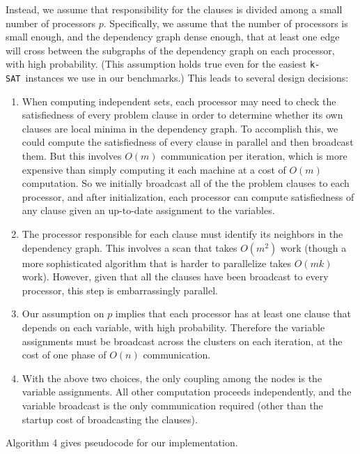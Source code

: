 \documentclass[twocolumn]{article}
\newcommand{\ksat}{\texttt{k-SAT}~}
\begin{document}
Instead, we assume that responsibility for the clauses is divided among a small number of processors $p$.  Specifically, we assume that the number of processors is small enough, and the dependency graph dense enough, that at least one edge will cross between the subgraphs of the dependency graph on each processor, with high probability.  (This assumption holds true even for the easiest \ksat instances we use in our benchmarks.)  This leads to several design decisions:
\begin{enumerate}
  \item When computing independent sets, each processor may need to check the satisfiedness of every problem clause in order to determine whether its own clauses are local minima in the dependency graph.  To accomplish this, we could compute the satisfiedness of every clause in parallel and then broadcast them.  But this involves $O(m)$ communication per iteration, which is more expensive than simply computing it each machine at a cost of $O(m)$ computation.  So we initially broadcast all of the the problem clauses to each processor, and after initialization, each processor can compute satisfiedness of any clause given an up-to-date assignment to the variables.
  \item The processor responsible for each clause must identify its neighbors in the dependency graph.  This involves a scan that takes $O(m^2)$ work (though a more sophisticated algorithm that is harder to parallelize takes $O(m k)$ work).  However, given that all the clauses have been broadcast to every processor, this step is embarrassingly parallel.
  \item Our assumption on $p$ implies that each processor has at least one clause that depends on each variable, with high probability.  Therefore the variable assignments must be broadcast across the clusters on each iteration, at the cost of one phase of $O(n)$ communication.
  \item With the above two choices, the only coupling among the nodes is the variable assignments.  All other computation proceeds independently, and the variable broadcast is the only communication required (other than the startup cost of broadcasting the clauses).
\end{enumerate}

Algorithm 4 gives pseudocode for our implementation.
\end{document}
